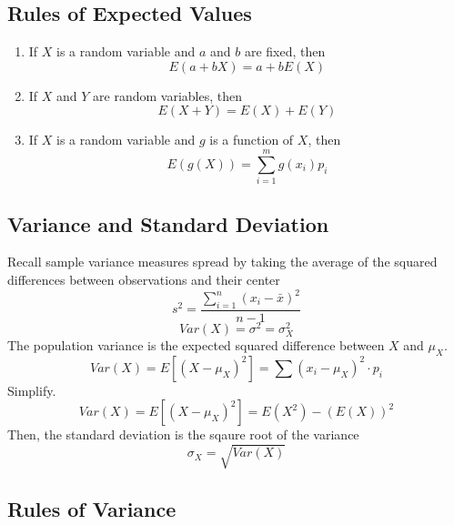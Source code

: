         \subsection{Rules of Expected Values}  %
            \begin{enumerate}
                \item If $X$ is a random variable and $a$ and $b$ are fixed, then
                \[E(a+bX)=a+bE(X)\]
                \item If $X$ and $Y$ are random variables, then
                \[E(X+Y)=E(X)+E(Y)\]
                \item If $X$ is a random variable and $g$ is a function of $X$, then
                \[E(g(X))=\sum_{i=1}^m g(x_i)p_i\]
            \end{enumerate}

        \subsection{Variance and Standard Deviation}  %
            Recall sample variance measures spread by taking the average of the squared differences between observations and their center
            \begin{equation}
                s^2=\frac{\sum_{i=1}^{n}{(x_i-\bar{x})}^2}{n-1}
            \end{equation}
            \begin{equation}
                Var(X)=\sigma^2 = \sigma_X^2
            \end{equation}
            The population variance is the expected squared difference between $X$ and $\mu_X$.
            \begin{equation}
                Var(X)=E[{(X-\mu_X)}^2]=\sum{(x_i-\mu_X)}^2\cdot p_i
            \end{equation}
            Simplify.
            \begin{equation}
                Var(X)=E[{(X-\mu_X)}^2]=E(X^2)-(E(X))^2
            \end{equation}
            Then, the standard deviation is the sqaure root of the variance
            \begin{equation}
                \sigma_X=\sqrt{Var(X)}
            \end{equation}

        \subsection{Rules of Variance}  %



